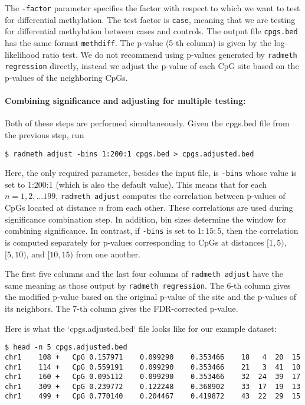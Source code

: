\documentclass[10pt]{article}
\begin{document}
The {\tt -factor} parameter specifies the factor with respect to which we
want to test for differential methylation. The test factor is {\tt case},
meaning that we are testing for differential methylation between cases and 
controls. The output file {\tt cpgs.bed} has the same format {\tt methdiff}.
The p-value (5-th column) is given by the log-likelihood ratio test. We do
not recommend using p-values generated by {\tt radmeth regression} directly,
instead we adjust the p-value of each CpG site based on the p-values of the
neighboring CpGs.

\paragraph{Combining significance and adjusting for multiple testing:} Both
of these steps are performed simultaneously. Given the cpgs.bed file from 
the previous step, run

{\small{%
\begin{verbatim}
$ radmeth adjust -bins 1:200:1 cpgs.bed > cpgs.adjusted.bed
\end{verbatim}%
}}

Here, the only required parameter, besides the input file, is {\tt -bins}
whose value is set to 1:200:1 (which is also the default value). This means
that for  each $n = 1, 2, . . . 199$, {\tt radmeth adjust} computes the
correlation between p-values of CpGs located at distance $n$ from each other.
These correlations are used during significance combination step. In
addition, bin sizes determine the window for combining significance. In
contrast, if {\tt -bins} is set to $1:15:5$, then the correlation is computed
separately for p-values corresponding to CpGs at distances $[1, 5)$, $[5,
10)$, and $[10, 15)$ from one another.

The first five columns and the last four columns of {\tt radmeth adjust} have
the same meaning as those output by {\tt radmeth regression}. The 6-th column
gives the modified p-value based on the original p-value of the site and the
p-values of its neighbors. The 7-th column gives the FDR-corrected p-value.

Here is what the `cpgs.adjusted.bed` ﬁle looks like for our example dataset:

{\small{%
\begin{verbatim}
$ head -n 5 cpgs.adjusted.bed
chr1	108	+	CpG	0.157971	0.099290	0.353466	18	 4	20	15
chr1	114	+	CpG	0.559191	0.099290	0.353466	21	 3	41	10
chr1	160	+	CpG	0.095112	0.099290	0.353466	32	24	39	17
chr1	309	+	CpG	0.239772	0.122248	0.368902	33	17	19	13
chr1	499	+	CpG	0.770140	0.204467	0.419872	43	22	29	15
\end{verbatim}%
}}
\end{document}
